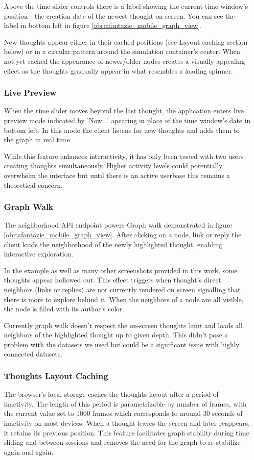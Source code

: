 Above the time slider controls there is a label showing the current time window's position - the creation date of the newest thought on screen.
You can see the label in bottom left in figure \ref{obr:afantazie_mobile_graph_view}.

New thoughts appear either in their cached positions (see Layout caching section below) or in a circular pattern around the simulation container’s center.
When not yet cached the appearance of newer/older nodes creates a visually appealing effect as the thoughts gradually appear in what resembles a loading spinner.

\subsubsection*{Live Preview}
When the time slider moves beyond the last thought, the application enters live preview mode indicated by 'Now...' apearing in place of the time window's date in bottom left.
In this mode the client listens for new thoughts and adds them to the graph in real time.

While this feature enhances interactivity, it has only been tested with two users creating thoughts simultaneously.
Higher activity levels could potentially overwhelm the interface but until there is an active userbase this remains a theoretical concern.

\subsubsection*{Graph Walk}
The neighborhood API endpoint powers Graph walk demonstrated in figure \ref{obr:afantazie_mobile_graph_view}.
After clicking on a node, link or reply the client loads the neighborhood of the newly highlighted thought, enabling interactive exploration.

In the example as well as many other screenshots provided in this work, some thoughts appear hollowed out.
This effect triggers when thought's direct neighbors (links or replies) are not currently rendered on screen
signalling that there is more to explore behind it.
When the neighbors of a node are all visible, the node is filled with its author's color.

Currently graph walk doesn't respect the on-screen thoughts limit and loads all neighbors of the highlighted thought up to given depth. This didn't pose a problem with the datasets we used but could be a significant issue with highly connected datasets.

\subsubsection*{Thoughts Layout Caching}
The browser’s local storage caches the thoughts layout after a period of inactivity.
The length of this period is parametrizable by number of frames,
with the current value set to 1000 frames which corresponds to around 30 seconds of inactivity on most devices.
When a thought leaves the screen and later reappears, it retains its previous position.
This feature facilitates graph stability during time sliding and between sessions and removes the need for the graph to re-stabilize again and again.

